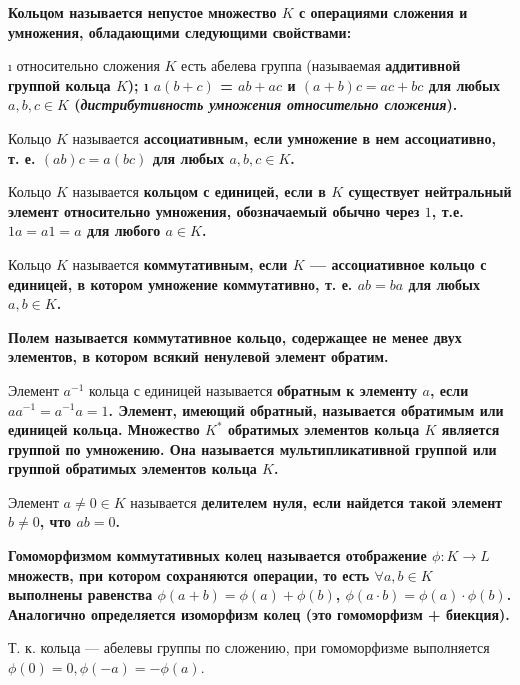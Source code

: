 

\date{}



\begin{defn}
\bf{Кольцом} называется непустое множество \(K\) с операциями сложения и умножения, обладающими следующими свойствами:

\begin{itemize}
\tightlist
\i
  относительно сложения \(K\) есть абелева группа (называемая \bf{аддитивной группой} кольца \(K\));
\i
  \(a(b+c)\) = \(ab+ac\) и \((a+b)c = ac+bc\) для любых \(a,b,c \in K\) (\emph{дистрибутивность умножения относительно сложения}).
\end{itemize}

Кольцо \(K\) называется \bf{ассоциативным}, если умножение в нем ассоциативно, т. е. \((ab)c = a(bc)\) для любых \(a, b, c \in K\).

Кольцо \(K\) называется \bf{кольцом с единицей}, если в \(K\) существует нейтральный элемент относительно умножения, обозначаемый обычно через \(1\), т.е. \(1a=a1=a\) для любого \(a\in K\).

Кольцо \(K\) называется \bf{коммутативным}, если \(K\) --- ассоциативное кольцо с единицей, в котором умножение коммутативно, т. е. \(ab = ba\) для любых \(a, b \in K\).

\bf{Полем} называется коммутативное кольцо, содержащее не менее двух элементов, в котором всякий ненулевой элемент обратим.
\end{defn}

\begin{defn}
Элемент \(a^{-1}\) кольца с единицей называется \bf{обратным} к элементу \(a\), если \(aa^{-1} = a^{-1}a = 1\). Элемент, имеющий обратный, называется \bf{обратимым} или \bf{единицей кольца}. Множество \(K^*\) обратимых элементов кольца \(K\) является группой по умножению. Она называется \bf{мультипликативной группой} или \bf{группой обратимых элементов} кольца \(K\).
\end{defn}

\begin{defn}
Элемент \(a\neq 0\in K\) называется \bf{делителем нуля}, если найдется такой элемент \(b \neq 0\), что \(ab=0\).
\end{defn}

\begin{defn}
\bf{Гомоморфизмом} коммутативных колец называется отображение \(\phi: K \to L\) множеств, при котором сохраняются операции, то есть \(\forall a,b \in K\) выполнены равенства \(\phi(a+b)=\phi(a)+\phi(b)\), \(\phi(a\cdot b)=\phi(a)\cdot \phi(b)\). Аналогично определяется \bf{изоморфизм} колец (это гомоморфизм + биекция).

Т. к. кольца --- абелевы группы по сложению, при гомоморфизме выполняется $\phi(0) = 0, \phi(-a) = -\phi(a)$.
\end{defn}

